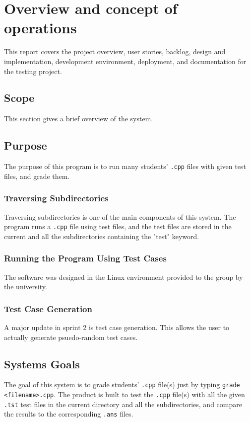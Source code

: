 
\chapter{Overview and concept of operations}

This report covers the project overview, user stories, backlog, design and implementation, development environment, deployment, and documentation for the testing project. 


\section{Scope}
This section gives a brief overview of the system.


\section{Purpose}
The purpose of this program is to run many students' {\tt .cpp} files with given test files, and grade them. 


\subsection{Traversing Subdirectories}
Traversing subdirectories is one of the main components of this system. The program runs a {\tt .cpp} file using test files, and the test files are stored in the current and all the subdirectories containing the "test" keyword.

\subsection{Running the Program Using Test Cases}
The software was designed in the Linux environment provided to the group by the university. 

\subsection{Test Case Generation}
A major update in sprint 2 is test case generation. This allows the user to actually generate psuedo-random test cases.

\section{Systems Goals}
The goal of this system is to grade students' {\tt .cpp} file(s) just by typing {\tt grade <filename>.cpp}. The product is built to test the {\tt .cpp} file(s) with all the given {\tt .tst} test files in the current directory and all the subdirectories, and compare the results to the corresponding {\tt .ans} files.


